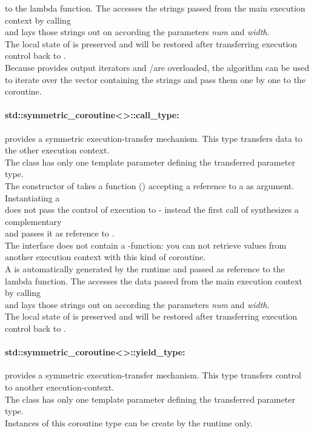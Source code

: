 to the lambda function. The \corofunction accesses the strings passed
from the main execution context by calling\\
\pullcoroget and lays those
strings out on  according the parameters \textit{num} and \textit{width}.\\
The local state of \corofunction is preserved and will be restored after
transferring execution control back to \corofunction.\\
Because \pushcoro provides output iterators and \bgin/\ed are overloaded, the
 algorithm can be used to iterate over the vector containing the
strings and pass them one by one to the coroutine.

\paragraph*{std::symmetric\_coroutine<>::call\_type:}
provides a symmetric execution-transfer mechanism. This type transfers data to
the other execution context.\\
The class has only one template parameter defining the transferred parameter
type.\\
The constructor of \callcoro takes a function (\corofunction) accepting a
reference to a \yieldcoro as argument. Instantiating a\\
\callcoro does not
pass the control of execution to \corofunction{ }- instead the first call of
\callcoroop synthesizes a complementary\\
\yieldcoro and passes it as reference to \corofunction.\\
\newline
The interface does not contain a \get-function: you can not retrieve values from
another execution context with this kind of coroutine.\\
\newline
A \yieldcoro is automatically generated by the runtime and passed as reference
to the lambda function. The \corofunction accesses the data passed from the
main execution context by calling\\
\yieldcoroget and lays those strings out on  according the
parameters \textit{num} and \textit{width}.\\
The local state of \corofunction is preserved and will be restored after
transferring execution control back to \corofunction.\\

\paragraph*{std::symmetric\_coroutine<>::yield\_type:}
provides a symmetric execution-transfer mechanism. This type transfers control
to another execution-context.\\
The class has only one template parameter defining the transferred parameter
type.\\
Instances of this coroutine type can be create by the runtime only.


